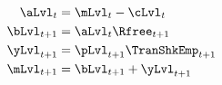   \begin{equation}\begin{gathered}\begin{aligned}
        \aLvl_{t}  & = \mLvl_{t}-\cLvl_{t} \label{DBCLevel}%
        \\  \bLvl_{t+1}  & = \aLvl_{t} \Rfree_{t+1}
        \\  \yLvl_{t+1}  & = \pLvl_{t+1}\TranShkEmp_{t+1}
        \\  \mLvl_{t+1}  & = \bLvl_{t+1} + \yLvl_{t+1} %
      \end{aligned}\end{gathered}\end{equation}

